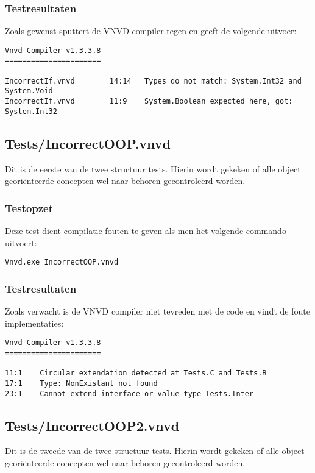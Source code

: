\subsubsection{Testresultaten}
Zoals gewenst sputtert de VNVD compiler tegen en geeft de volgende uitvoer:

\begin{lstlisting}
Vnvd Compiler v1.3.3.8
======================

IncorrectIf.vnvd        14:14   Types do not match: System.Int32 and System.Void
IncorrectIf.vnvd        11:9    System.Boolean expected here, got: System.Int32
\end{lstlisting}

\subsection{Tests/IncorrectOOP.vnvd}
Dit is de eerste van de twee structuur tests. Hierin wordt gekeken of alle object geori\"enteerde concepten wel naar behoren gecontroleerd worden.

\subsubsection{Testopzet}
Deze test dient compilatie fouten te geven als men het volgende commando uitvoert:

\begin{lstlisting}
Vnvd.exe IncorrectOOP.vnvd
\end{lstlisting}

\subsubsection{Testresultaten}
Zoals verwacht is de VNVD compiler niet tevreden met de code en vindt de foute implementaties:

\begin{lstlisting}
Vnvd Compiler v1.3.3.8
======================

11:1    Circular extendation detected at Tests.C and Tests.B
17:1    Type: NonExistant not found
23:1    Cannot extend interface or value type Tests.Inter
\end{lstlisting}

\subsection{Tests/IncorrectOOP2.vnvd}
Dit is de tweede van de twee structuur tests. Hierin wordt gekeken of alle object geori\"enteerde concepten wel naar behoren gecontroleerd worden.

